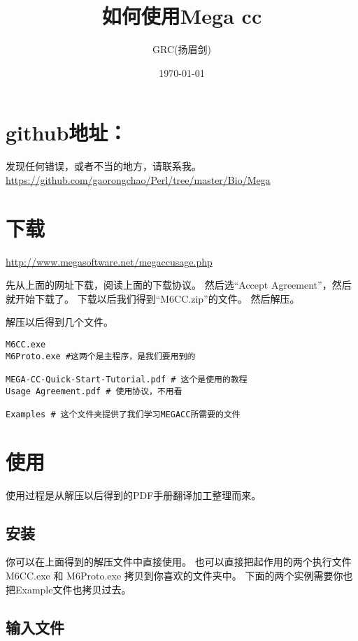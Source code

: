 \documentclass[11pt]{ctexart}
\title{如何使用Mega cc}
\author{GRC(扬眉剑)}
\date{\today}
\begin{document}
\maketitle

\setcounter{tocdepth}{3}
\tableofcontents
\vspace*{1cm}

\section{github地址：}
\label{sec-1}

发现任何错误，或者不当的地方，请联系我。
\href{https://github.com/gaorongchao/Perl/tree/master/Bio/Mega}{https://github.com/gaorongchao/Perl/tree/master/Bio/Mega}
\section{下载}
\label{sec-2}

\href{http://www.megasoftware.net/megaccusage.php}{http://www.megasoftware.net/megaccusage.php}

先从上面的网址下载，阅读上面的下载协议。
然后选“Accept Agreement”，然后就开始下载了。
下载以后我们得到“M6CC.zip”的文件。
然后解压。

解压以后得到几个文件。

\begin{verbatim}
M6CC.exe
M6Proto.exe #这两个是主程序，是我们要用到的

MEGA-CC-Quick-Start-Tutorial.pdf # 这个是使用的教程
Usage Agreement.pdf # 使用协议，不用看

Examples # 这个文件夹提供了我们学习MEGACC所需要的文件
\end{verbatim}
\section{使用}
\label{sec-3}

使用过程是从解压以后得到的PDF手册翻译加工整理而来。
\subsection{安装}
\label{sec-3-1}

你可以在上面得到的解压文件中直接使用。
也可以直接把起作用的两个执行文件M6CC.exe 和 M6Proto.exe
拷贝到你喜欢的文件夹中。
下面的两个实例需要你也把Example文件也拷贝过去。
\subsection{输入文件}
\label{sec-3-2}
\end{document}
